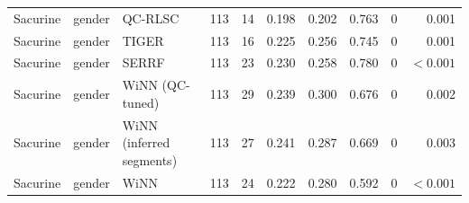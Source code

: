 \begin{landscape}
\begin{longtable}{lllrrrrrrr}
Sacurine & gender & QC-RLSC & 113 & 14 & 0.198 & 0.202 & 0.763 & 0 & 0.001 \\
Sacurine & gender & TIGER & 113 & 16 & 0.225 & 0.256 & 0.745 & 0 & 0.001 \\
Sacurine & gender & SERRF & 113 & 23 & 0.230 & 0.258 & 0.780 & 0 & $<0.001$ \\
Sacurine & gender & WiNN (QC-tuned) & 113 & 29 & 0.239 & 0.300 & 0.676 & 0 & 0.002 \\
Sacurine & gender & WiNN (inferred segments) & 113 & 27 & 0.241 & 0.287 & 0.669 & 0 & 0.003 \\
Sacurine & gender & WiNN & 113 & 24 & 0.222 & 0.280 & 0.592 & 0 & $<0.001$ \\
\end{longtable}
\end{landscape}
